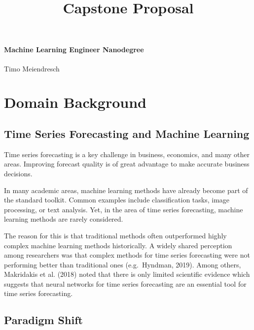 \documentclass[11pt]{article}
\title{Capstone Proposal}
\begin{document}
    
    
    \maketitle
    
    

    
    \hypertarget{machine-learning-engineer-nanodegree}{%
\paragraph{Machine Learning Engineer
Nanodegree}\label{machine-learning-engineer-nanodegree}}

Timo Meiendresch

    \hypertarget{domain-background}{%
\section{Domain Background}\label{domain-background}}

\hypertarget{time-series-forecasting-and-machine-learning}{%
\subsection{Time Series Forecasting and Machine
Learning}\label{time-series-forecasting-and-machine-learning}}

Time series forecasting is a key challenge in business, economics, and
many other areas. Improving forecast quality is of great advantage to
make accurate business decisions.

In many academic areas, machine learning methods have already become
part of the standard toolkit. Common examples include classification
tasks, image processing, or text analysis. Yet, in the area of time
series forecasting, machine learning methods are rarely considered.

The reason for this is that traditional methods often outperformed
highly complex machine learning methods historically. A widely shared
perception among researchers was that complex methods for time series
forecasting were not performing better than traditional ones
(e.g.~Hyndman, 2019). Among others, Makridakis et al. (2018) noted that
there is only limited scientific evidence which suggests that neural
networks for time series forecasting are an essential tool for time
series forecasting.

\hypertarget{paradigm-shift}{%
\subsection{Paradigm Shift}\label{paradigm-shift}}
\end{document}
